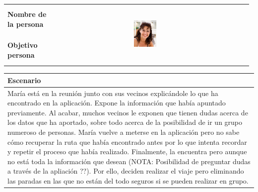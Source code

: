 \documentclass[11pt]{article}
\begin{document}
\begin{table}[H]
  \centering
  \begin{tabular}{p{0.2\linewidth}|p{0.3\linewidth}p{0.475\linewidth}}
    \toprule
    \textbf{Nombre de la persona} &  &\multirow{2}{*}{\begin{minipage}{1.\textwidth}\includegraphics[width=0.2\textwidth, height=30mm]{Maria}\end{minipage}}\\
    \textbf{Objetivo persona} &  & \\
    \bottomrule
  \end{tabular}

\begin{tabular}{p{1.028\linewidth}}
  \textbf{Escenario}\\
  \midrule
  María está en la reunión junto con sus vecinos explicándole lo que ha encontrado en la aplicación. Expone la información que había apuntado previamente. Al acabar, muchos vecinos le exponen que tienen dudas acerca de los datos que ha aportado, sobre todo acerca de la posibilidad de ir un grupo numeroso de personas. María vuelve a meterse en la aplicación pero no sabe cómo recuperar la ruta que había encontrado antes por lo que intenta recordar y repetir el proceso que había realizado. Finalmente, la encuentra pero aunque no está toda la información que desean (NOTA: Posibilidad de preguntar dudas a través de la apliación ??). Por ello, deciden realizar el viaje pero eliminando las paradas en las que no están del todo seguros si se pueden realizar en grupo.
\end{tabular}
\end{table}
\end{document}

